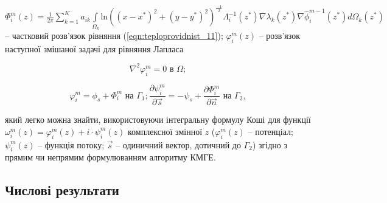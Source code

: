 \noindent $\Phi_{i}^{m}{(z) = \frac{1}{2\pi}}{\sum\limits_{k = 1}^{K}{a_{ik}}{\int\limits_{\Omega_{k}}{\text{ln}( {( {x
- x^{*}} )^{2} + ( {y - y^{*}} )^{2}} )}}}^{\frac{- 1}{2}}{\Lambda_{i}^{- 1}( z^{*} )}{\nabla\lambda_{k}( z^{*}
)}{\nabla{\hat{\phi}}_{i}^{m - 1}( z^{*} )}{d\Omega_{k}( z^{*})}$ -- частковий розв'язок рівняння
(\ref{eqn:teploprovidnist_11}); $\varphi_{i}^{m}(z)$ -- розв'язок наступної змішаної задачі для рівняння Лапласа

\begin{equation*}
    \nabla^{2}\varphi_{i}^{m} = 0 \text{ в } \Omega;
\end{equation*}

\begin{equation*}
    \varphi_{i}^{m} = {\phi_{s} + \Phi_{i}^{m}} \text{ на } \Gamma_{1};
    \frac{\partial\psi_{i}^{m}}{\partial\overrightarrow{s}} = {{- \psi_{s}} + \frac{\partial\Phi_{i}^{m}}{\partial\overrightarrow{n}}} 
    \text{ на } \Gamma_{2},
\end{equation*}

\noindent який легко можна знайти, використовуючи інтегральну формулу Коші для функції $\omega_{i}^{m}{(z) =
\varphi_{i}^{m}}{(z) + {i \cdot \psi_{i}^{m}}}(z)$ комплексної змінної $z$ ($\varphi_{i}^{m}(z)$ -- потенціал;
$\psi_{i}^{m}(z)$ -- функція потоку; $\overrightarrow{s}$ -- одиничний вектор, дотичний до $\Gamma_{2}$) згідно з прямим
чи непрямим формулюванням алгоритму КМГЕ.

\subsection{Числові результати}







